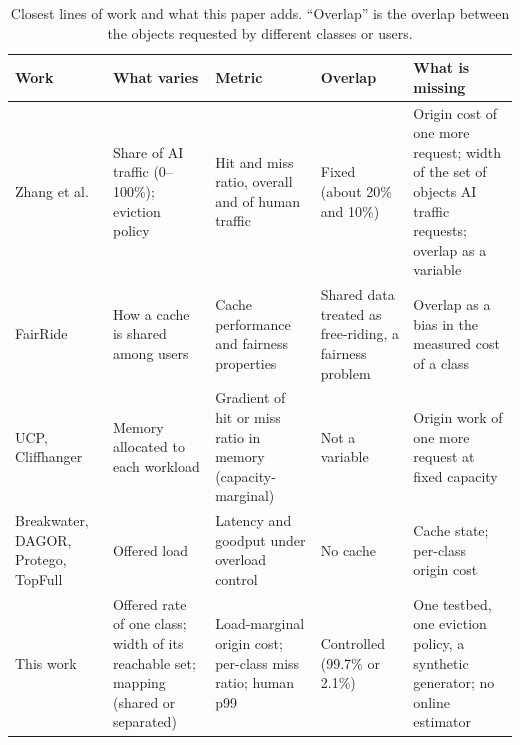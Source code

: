 \begin{table}[t]
\caption{Closest lines of work and what this paper adds. ``Overlap'' is the overlap between
the objects requested by different classes or users.}
\label{tab:rw}
\centering\scriptsize
\renewcommand{\arraystretch}{1.15}
\begin{tabularx}{\textwidth}{@{}>{\raggedright\arraybackslash}p{2.2cm}
  >{\raggedright\arraybackslash}X>{\raggedright\arraybackslash}X
  >{\raggedright\arraybackslash}X>{\raggedright\arraybackslash}X@{}}
\toprule
Work & What varies & Metric & Overlap & What is missing \\
\midrule
Zhang et al.~\cite{zhang2025} & Share of AI traffic (0--100\%); eviction policy &
  Hit and miss ratio, overall and of human traffic &
  Fixed (about 20\% and 10\%) &
  Origin cost of one more request; width of the set of objects AI traffic requests; overlap as a variable \\
\addlinespace
FairRide~\cite{pu2016fairride} & How a cache is shared among users &
  Cache performance and fairness properties &
  Shared data treated as free-riding, a fairness problem &
  Overlap as a bias in the measured cost of a class \\
\addlinespace
UCP, Cliffhanger~\cite{qureshi2006ucp,cidon2016cliffhanger} & Memory allocated to each
  workload & Gradient of hit or miss ratio in memory (capacity-marginal) &
  Not a variable & Origin work of one more request at fixed capacity \\
\addlinespace
Breakwater, DAGOR, Protego, \mbox{TopFull}~\cite{cho2020breakwater,zhou2018dagor,cho2023protego,park2024topfull} &
  Offered load & Latency and goodput under overload control &
  No cache & Cache state; per-class origin cost \\
\addlinespace
This work & Offered rate of one class; width of its reachable set; mapping (shared or
  separated) & Load-marginal origin cost; per-class miss ratio; human p99 &
  Controlled (99.7\% or 2.1\%) &
  One testbed, one eviction policy, a synthetic generator; no online estimator \\
\bottomrule
\end{tabularx}
\end{table}

